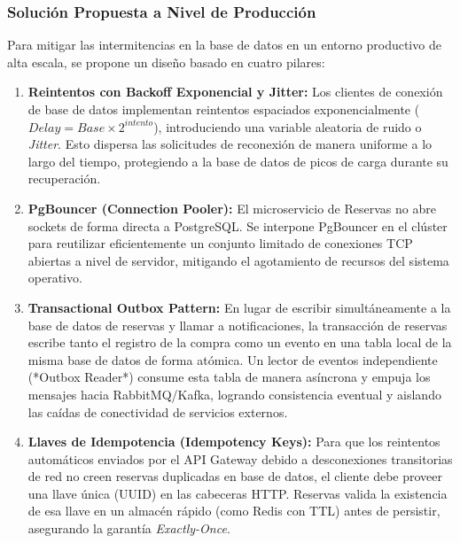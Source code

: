\documentclass[12pt,letterpaper]{article}
\begin{document}
\subsubsection{Solución Propuesta a Nivel de Producción}
Para mitigar las intermitencias en la base de datos en un entorno productivo de alta escala, se propone un diseño basado en cuatro pilares:
\begin{enumerate}
    \item \textbf{Reintentos con Backoff Exponencial y Jitter:} Los clientes de conexión de base de datos implementan reintentos espaciados exponencialmente ($Delay = Base \times 2^{intento}$), introduciendo una variable aleatoria de ruido o \textit{Jitter}. Esto dispersa las solicitudes de reconexión de manera uniforme a lo largo del tiempo, protegiendo a la base de datos de picos de carga durante su recuperación.
    \item \textbf{PgBouncer (Connection Pooler):} El microservicio de Reservas no abre sockets de forma directa a PostgreSQL. Se interpone PgBouncer en el clúster para reutilizar eficientemente un conjunto limitado de conexiones TCP abiertas a nivel de servidor, mitigando el agotamiento de recursos del sistema operativo.
    \item \textbf{Transactional Outbox Pattern:} En lugar de escribir simultáneamente a la base de datos de reservas y llamar a notificaciones, la transacción de reservas escribe tanto el registro de la compra como un evento en una tabla local de la misma base de datos de forma atómica. Un lector de eventos independiente (*Outbox Reader*) consume esta tabla de manera asíncrona y empuja los mensajes hacia RabbitMQ/Kafka, logrando consistencia eventual y aislando las caídas de conectividad de servicios externos.
    \item \textbf{Llaves de Idempotencia (Idempotency Keys):} Para que los reintentos automáticos enviados por el API Gateway debido a desconexiones transitorias de red no creen reservas duplicadas en base de datos, el cliente debe proveer una llave única (UUID) en las cabeceras HTTP. Reservas valida la existencia de esa llave en un almacén rápido (como Redis con TTL) antes de persistir, asegurando la garantía \textit{Exactly-Once}.
\end{enumerate}
\end{document}
